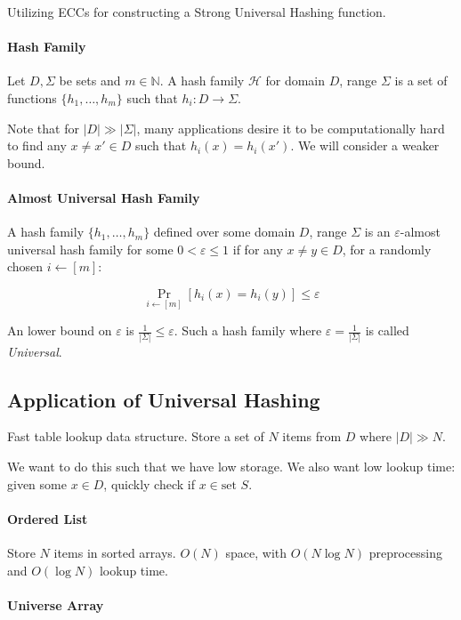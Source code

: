 \documentclass{idc_msc}
\begin{document}
Utilizing ECCs for constructing a Strong Universal Hashing function.

\paragraph{Hash Family}

Let \(D, \Sigma\) be sets and \(m \in \mathbb{N}\).
A hash family \(\mathcal{H}\) for domain \(D\), range \(\Sigma\) is a set of functions \(\{h_1,\ldots,h_m\}\) such that \(h_i : D \to \Sigma\).

Note that for \(|D| \gg |\Sigma|\), many applications desire it to be computationally hard to find any \(x \ne x' \in D\) such that \(h_i(x) = h_i(x')\). We will consider a weaker bound.

\paragraph{Almost Universal Hash Family}

A hash family \(\{h_1, \ldots, h_m\}\) defined over some domain \(D\), range \(\Sigma\) is an \(\varepsilon\)-almost universal hash family for some \(0 < \varepsilon \le 1\) if for any \(x \ne y \in D\), for a randomly chosen \(i \gets [m]\):

\[\Pr_{i \gets [m]}[h_i(x) = h_i(y)] \le \varepsilon\]

An lower bound on \(\varepsilon\) is \(\frac{1}{|\Sigma|} \le \varepsilon\).
Such a hash family where \(\varepsilon = \frac{1}{|\Sigma|}\) is called \emph{Universal}.

\subsection{Application of Universal Hashing}

Fast table lookup data structure.
Store a set of \(N\) items from \(D\) where \(|D| \gg N\).

We want to do this such that we have low storage.
We also want low lookup time: given some \(x \in D\), quickly check if \(x \in \text{set }S\).

\paragraph{Ordered List}

Store \(N\) items in sorted arrays.
\(O(N)\) space, with \(O(N \log N)\) preprocessing and \(O(\log N)\) lookup time.

\paragraph{Universe Array}
\end{document}
